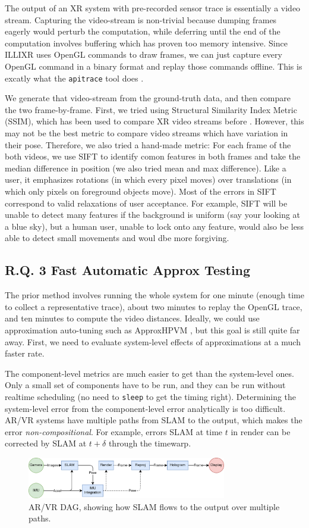The output of an XR system with pre-recorded sensor trace is essentially a video stream. Capturing the video-stream is non-trivial because dumping frames eagerly would perturb the computation, while deferring until the end of the computation involves buffering which has proven too memory intensive. Since ILLIXR uses OpenGL commands to draw frames, we can just capture every OpenGL command in a binary format and replay those commands offline. This is excatly what the \verb+apitrace+ tool does \cite{apitrace}.

We generate that video-stream from the ground-truth data, and then compare the two frame-by-frame. First, we tried using Structural Similarity Index Metric (SSIM), which has been used to compare XR video streams before . However, this may not be the best metric to compare video streams which have variation in their pose. Therefore, we also tried a hand-made metric: For each frame of the both videos, we use SIFT to identify comon features in both frames  and take the median difference in position (we also tried mean and max difference). Like a user, it emphasizes rotations (in which every pixel moves) over translations (in which only pixels on foreground objects move). Most of the errors in SIFT correspond to valid relaxations of user acceptance. For example, SIFT will be unable to detect many features if the background is uniform (say your looking at a blue sky), but a human user, unable to lock onto any feature, would also be less able to detect small movements and woul dbe more forgiving.


\subsection{R.Q. 3 Fast Automatic Approx Testing}

The prior method involves running the whole system for one minute (enough time to collect a representative trace), about two minutes to replay the OpenGL trace, and ten minutes to compute the video distances. Ideally, we could use approximation auto-tuning such as ApproxHPVM \cite{approxhpvm}, but this goal is still quite far away. First, we need to evaluate system-level effects of approximations at a much faster rate.

The component-level metrics are much easier to get than the system-level ones. Only a small set of components have to be run, and they can be run without realtime scheduling (no need to \verb+sleep+ to get the timing right). Determining the system-level error from the component-level error analytically is too difficult. AR/VR systems have multiple paths from SLAM to the output, which makes the error \textit{non-compositional}. For example, errors SLAM at time \(t\) in render can be corrected by SLAM at \(t+\delta\) through the timewarp.

\begin{figure}
\caption{AR/VR DAG, showing how SLAM flows to the output over multiple paths.}
\includegraphics[height=1.8cm]{dag.png}
\end{figure}
